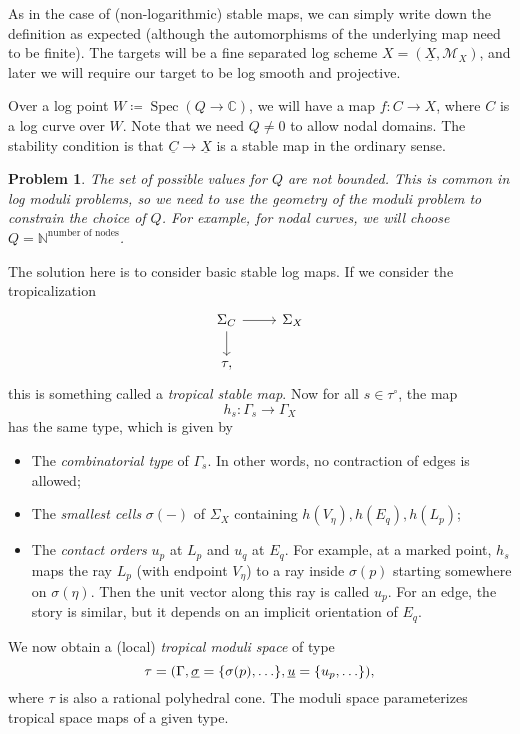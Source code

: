 \documentclass[leqno, openany]{memoir}
\newtheorem{prob}[thm]{Problem}
\theoremstyle{definition}
\theoremstyle{remark}
\theoremstyle{plain}
\theoremstyle{definition}
\theoremstyle{remark}
\newcommand{\N}{\mathbb{N}}
\newcommand{\C}{\mathbb{C}}
\newcommand{\mc}[1]{\mathcal{#1}}
\newcommand{\ul}[1]{\underline{#1}}
\DeclareMathOperator{\Spec}{Spec}
\begin{document}
As in the case of (non-logarithmic) stable maps, we can simply write down the definition as expected (although the automorphisms of the underlying map need to be finite). The targets will be a fine separated log scheme $X = (\ul{X}, \mc{M}_X)$, and later we will require our target to be log smooth and projective.

Over a log point $W \coloneqq \Spec(Q \to \C)$, we will have a map $f \colon C \to X$, where $C$ is a log curve over $W$. Note that we need $Q \neq 0$ to allow nodal domains. The stability condition is that $\ul{C} \to \ul{X}$ is a stable map in the ordinary sense.

\begin{prob}
The set of possible values for $Q$ are not bounded. This is common in log moduli problems, so we need to use the geometry of the moduli problem to constrain the choice of $Q$. For example, for nodal curves, we will choose $Q = \N^{\text{number of nodes}}$.
\end{prob}

The solution here is to consider basic stable log maps. If we consider the tropicalization
\begin{equation*}
  \begin{tikzcd}
    \Sigma_C \ar{r} \ar{d} & \Sigma_X \\
    \tau,
  \end{tikzcd}
\end{equation*}
this is something called a \textit{tropical stable map}. Now for all $s \in \tau^{\circ}$, the map
\[ h_s \colon \Gamma_s \to \Gamma_X \]
has the same type, which is given by
\begin{itemize}
\item The \emph{combinatorial type} of $\Gamma_s$. In other words, no contraction of edges is allowed;
\item The \emph{smallest cells} $\sigma(-)$ of $\Sigma_X$ containing $h(V_{\eta}), h(E_q), h(L_p)$;
\item The \emph{contact orders} $u_p$ at $L_p$ and $u_q$ at $E_q$. For example, at a marked point, $h_s$ maps the ray $L_p$ (with endpoint $V_{\eta}$) to a ray inside $\sigma(p)$ starting somewhere on $\sigma(\eta)$. Then the unit vector along this ray is called $u_p$. For an edge, the story is similar, but it depends on an implicit orientation of $E_q$.
\end{itemize}

We now obtain a (local) \textit{tropical moduli space} of type
\[ \tau = (\Gamma, \ul{\sigma} = \qty{\sigma(p), \ldots}, \ul{u} = \qty{u_p, \ldots}), \]
where $\tau$ is also a rational polyhedral cone. The moduli space parameterizes tropical space maps of a given type.
\end{document}
